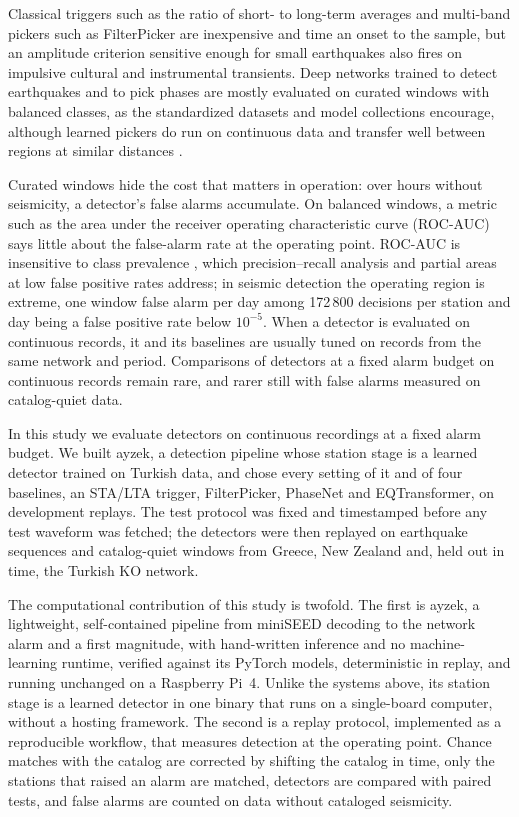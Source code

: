 \documentclass[a4paper,fleqn]{cas-sc}
\newcommand{\stalta}{STA/LTA}
\begin{document}
Classical triggers such as the ratio of short- to long-term averages
\citep{allen1978,withers1998} and multi-band pickers such as FilterPicker
\citep{lomax2012} are inexpensive and time an onset to the sample, but an amplitude
criterion sensitive enough for small earthquakes also fires on impulsive cultural and
instrumental transients. Deep networks trained to detect earthquakes
\citep{perol2018,ross2018,mousavi2019cred} and to pick phases
\citep{zhu2019,mousavi2020eqt} are mostly evaluated on curated windows with balanced
classes, as the standardized datasets \citep{mousavi2019stead} and model collections
\citep{woollam2022} encourage, although learned pickers do run on continuous data
\citep{mousavi2020eqt,yeck2021} and transfer well between regions at similar
distances \citep{munchmeyer2022}.

Curated windows hide the cost that matters in operation: over hours without
seismicity, a detector's false alarms accumulate. On balanced windows, a metric such
as the area under the receiver operating characteristic curve (ROC-AUC) says little
about the false-alarm rate at the operating point. ROC-AUC is insensitive to class
prevalence \citep{fawcett2006}, which precision--recall analysis
\citep{davis2006,saito2015} and partial areas at low false positive rates
\citep{mcclish1989} address; in seismic detection the operating region is extreme,
one window false alarm per day among 172\,800 decisions per station and day being a
false positive rate below $10^{-5}$. When a detector is evaluated on continuous
records, it and its baselines are usually tuned on records from the same network and
period. Comparisons of detectors at a fixed alarm budget on continuous records remain
rare, and rarer still with false alarms measured on catalog-quiet data.

In this study we evaluate detectors on continuous recordings at a fixed alarm budget.
We built ayzek, a detection pipeline whose station stage is a learned detector trained
on Turkish data, and chose every setting of it and of four baselines, an \stalta{}
trigger, FilterPicker, PhaseNet and EQTransformer, on development replays. The test
protocol was fixed and timestamped before any test waveform was fetched; the detectors
were then replayed on earthquake sequences and catalog-quiet windows from Greece, New
Zealand and, held out in time, the Turkish KO network.

The computational contribution of this study is twofold. The first is ayzek, a
lightweight, self-contained pipeline from miniSEED decoding to the network
alarm and a first magnitude, with hand-written inference and no machine-learning
runtime, verified against its PyTorch models, deterministic in replay, and running
unchanged on a Raspberry Pi~4. Unlike the systems above, its station stage is a
learned detector in one binary that runs on a single-board computer, without a
hosting framework. The second is a replay protocol,
implemented as a reproducible workflow, that measures detection at the operating
point. Chance matches with the catalog are corrected by shifting the catalog in time,
only the stations that raised an alarm are matched, detectors are compared with
paired tests, and false alarms are counted on data without cataloged seismicity.
\end{document}
